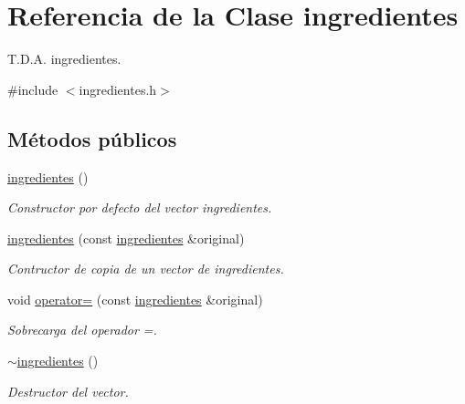 \hypertarget{classingredientes}{}\section{Referencia de la Clase ingredientes}
\label{classingredientes}


T.\+D.\+A. ingredientes.  




{\ttfamily \#include $<$ingredientes.\+h$>$}

\subsection*{Métodos públicos}
\begin{DoxyCompactItemize}
\item 
\mbox{\label{classingredientes_adb3e000aa798184c7253c401f165c1a5}} 
\hyperlink{classingredientes_adb3e000aa798184c7253c401f165c1a5}{ingredientes} ()
\begin{DoxyCompactList}\small\item\em Constructor por defecto del vector ingredientes. \end{DoxyCompactList}\item 
\mbox{\label{classingredientes_a7470e2be68c17cfa3193f4cf2cb57872}} 
\hyperlink{classingredientes_a7470e2be68c17cfa3193f4cf2cb57872}{ingredientes} (const \hyperlink{classingredientes}{ingredientes} \&original)
\begin{DoxyCompactList}\small\item\em Contructor de copia de un vector de ingredientes. \end{DoxyCompactList}\item 
void \hyperlink{classingredientes_ab5478a896ab96486a86dfb1b5707c565}{operator=} (const \hyperlink{classingredientes}{ingredientes} \&original)
\begin{DoxyCompactList}\small\item\em Sobrecarga del operador =. \end{DoxyCompactList}\item 
\mbox{\label{classingredientes_a91a5e8d5d27853f07314a97928500dfe}} 
\hyperlink{classingredientes_a91a5e8d5d27853f07314a97928500dfe}{$\sim$ingredientes} ()
\begin{DoxyCompactList}\small\item\em Destructor del vector. \end{DoxyCompactList}\item 

\end{DoxyCompactItemize}
